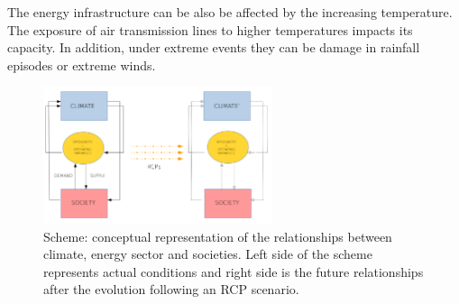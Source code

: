 The energy infrastructure can be also be affected by the increasing temperature. The exposure of air transmission lines to higher temperatures impacts its capacity. In addition, under extreme events they can be damage in rainfall episodes or extreme winds. 


\begin{figure}[h!]
\centering\includegraphics[width=0.6\textwidth]{figs/esquema.pdf}
\caption{Scheme: conceptual representation of the relationships between climate, energy sector and societies. Left side of the scheme represents actual conditions and right side is the future relationships after the evolution following an RCP scenario. }
\label{fig:feedback}
\end{figure}

 






